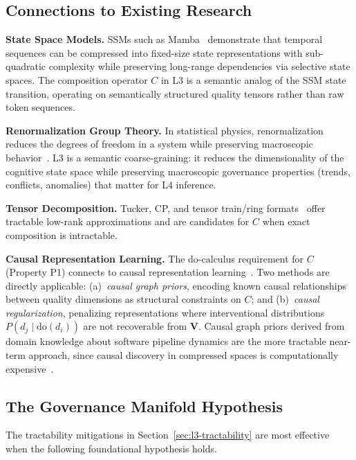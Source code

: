 \documentclass[11pt]{article}
\theoremstyle{definition}
\theoremstyle{remark}
\begin{document}
\subsection{Connections to Existing Research}

\textbf{State Space Models.} SSMs such as
Mamba~\cite{gu2023mamba} demonstrate that temporal sequences can be
compressed into fixed-size state representations with sub-quadratic
complexity while preserving long-range dependencies via selective
state spaces. The composition operator $C$ in L3 is a semantic
analog of the SSM state transition, operating on semantically
structured quality tensors rather than raw token sequences.

\medskip
\noindent\textbf{Renormalization Group Theory.} In statistical
physics, renormalization reduces the degrees of freedom in a system
while preserving macroscopic behavior~\cite{wilson1971renormalization}.
L3 is a semantic coarse-graining: it reduces the dimensionality of
the cognitive state space while preserving macroscopic governance
properties (trends, conflicts, anomalies) that matter for L4
inference.

\medskip
\noindent\textbf{Tensor Decomposition.} Tucker, CP, and tensor
train/ring formats~\cite{kolda2009tensor} offer tractable low-rank
approximations and are candidates for $C$ when exact composition is
intractable.

\medskip
\noindent\textbf{Causal Representation Learning.} The do-calculus
requirement for $C$ (Property P1) connects to causal representation
learning~\cite{scholkopf2021causal}. Two methods are directly
applicable: (a)~\emph{causal graph priors}, encoding known causal
relationships between quality dimensions as structural constraints on
$C$; and (b)~\emph{causal regularization}, penalizing representations
where interventional distributions $P(d_j \mid \mathrm{do}(d_i))$ are
not recoverable from $\mathbf{V}$. Causal graph priors derived from
domain knowledge about software pipeline dynamics are the more
tractable near-term approach, since causal discovery in compressed
spaces is computationally expensive~\cite{scholkopf2021causal}.

\subsection{The Governance Manifold Hypothesis}
\label{sec:manifold}

The tractability mitigations in Section~\ref{sec:l3-tractability} are
most effective when the following foundational hypothesis holds.
\end{document}
